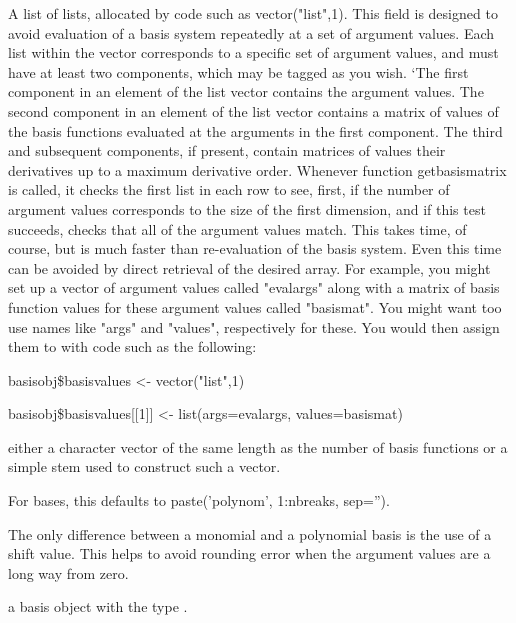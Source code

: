 \begin{Arguments}
\begin{ldescription}
\item[\code{basisvalues}] A list of lists, allocated by code such as vector("list",1).  This
field is designed to avoid evaluation of a basis system repeatedly
at a set of argument values.  Each list within the vector
corresponds to a specific set of argument values, and must have at
least two components, which may be tagged as you wish.  `The first
component in an element of the list vector contains the argument
values.  The second component in an element of the list vector
contains a matrix of values of the basis functions evaluated at the
arguments in the first component.  The third and subsequent
components, if present, contain matrices of values their derivatives
up to a maximum derivative order.  Whenever function getbasismatrix
is called, it checks the first list in each row to see, first, if
the number of argument values corresponds to the size of the first
dimension, and if this test succeeds, checks that all of the
argument values match.  This takes time, of course, but is much
faster than re-evaluation of the basis system.  Even this time can
be avoided by direct retrieval of the desired array.  For example,
you might set up a vector of argument values called "evalargs" along
with a matrix of basis function values for these argument values
called "basismat".  You might want too use names like "args" and
"values", respectively for these.  You would then assign them to
 with code such as the following:

basisobj\$basisvalues <- vector("list",1)

basisobj\$basisvalues[[1]] <- list(args=evalargs,
values=basismat)

\item[\code{names}] either a character vector of the same length as the number of basis
functions or a simple stem used to construct such a vector.

For  bases, this defaults to paste('polynom',
1:nbreaks, sep='').

\end{ldescription}
\end{Arguments}
\begin{Details}\relax
The only difference between a monomial and a polynomial basis
is the use of a shift value.  This helps to avoid rounding error
when the argument values are a long way from zero.
\end{Details}
\begin{Value}
a basis object with the type .
\end{Value}
